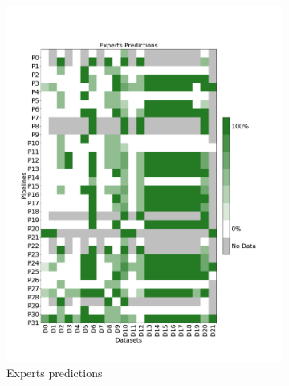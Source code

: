 \begin{figure}
\centering
\begin{subfigure}{.55\textwidth}  \includegraphics[width=\columnwidth]{figures/Commented Success Percentage.pdf}
  \caption{Experts predictions}
  \label{fig:experts_matrix}
\end{subfigure} \hfill
\begin{subfigure}{.55\textwidth}

\end{subfigure}
\end{figure}
